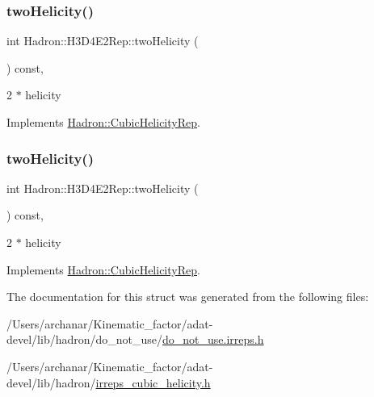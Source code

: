 \subsubsection{\texorpdfstring{twoHelicity()}{twoHelicity()}\hspace{0.1cm}{\footnotesize\ttfamily [2/3]}}
{\footnotesize\ttfamily int Hadron\+::\+H3\+D4\+E2\+Rep\+::two\+Helicity (\begin{DoxyParamCaption}{ }\end{DoxyParamCaption}) const\hspace{0.3cm}{\ttfamily [inline]}, {\ttfamily [virtual]}}

2 $\ast$ helicity 

Implements \mbox{\hyperlink{structHadron_1_1CubicHelicityRep_af507aa56fc2747eacc8cb6c96db31ecc}{Hadron\+::\+Cubic\+Helicity\+Rep}}.

\mbox{\label{structHadron_1_1H3D4E2Rep_ae31f919f05b46798018cf3eb99816051}} 
\subsubsection{\texorpdfstring{twoHelicity()}{twoHelicity()}\hspace{0.1cm}{\footnotesize\ttfamily [3/3]}}
{\footnotesize\ttfamily int Hadron\+::\+H3\+D4\+E2\+Rep\+::two\+Helicity (\begin{DoxyParamCaption}{ }\end{DoxyParamCaption}) const\hspace{0.3cm}{\ttfamily [inline]}, {\ttfamily [virtual]}}

2 $\ast$ helicity 

Implements \mbox{\hyperlink{structHadron_1_1CubicHelicityRep_af507aa56fc2747eacc8cb6c96db31ecc}{Hadron\+::\+Cubic\+Helicity\+Rep}}.



The documentation for this struct was generated from the following files\+:\begin{DoxyCompactItemize}
\item 
/\+Users/archanar/\+Kinematic\+\_\+factor/adat-\/devel/lib/hadron/do\+\_\+not\+\_\+use/\mbox{\hyperlink{adat-devel_2lib_2hadron_2do__not__use_2do__not__use_8irreps_8h}{do\+\_\+not\+\_\+use.\+irreps.\+h}}\item 
/\+Users/archanar/\+Kinematic\+\_\+factor/adat-\/devel/lib/hadron/\mbox{\hyperlink{adat-devel_2lib_2hadron_2irreps__cubic__helicity_8h}{irreps\+\_\+cubic\+\_\+helicity.\+h}}\end{DoxyCompactItemize}
